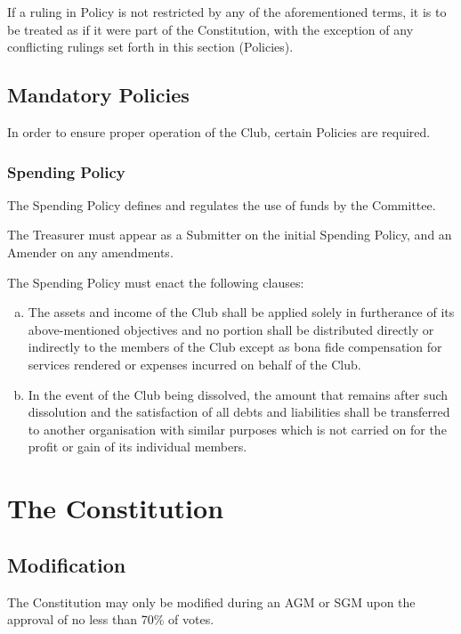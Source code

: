 \documentclass[a4paper,12pt]{article}
\begin{document}
If a ruling in Policy is not restricted by any of the aforementioned terms, it is to be treated as if it were part of the Constitution, with the exception of any conflicting rulings set forth in this section (Policies).

\subsection{Mandatory Policies}

In order to ensure proper operation of the Club, certain Policies are required.

\subsubsection{Spending Policy}
The Spending Policy defines and regulates the use of funds by the Committee.

The Treasurer must appear as a Submitter on the initial Spending Policy, and an Amender on any amendments.

The Spending Policy must enact the following clauses:
\begin{enumerate}[a)]
    \item The assets and income of the Club shall be applied solely in furtherance of its above-mentioned objectives and no portion shall be distributed directly or indirectly to the members of the Club except as bona fide compensation for services rendered or expenses incurred on behalf of the Club.
    \item In the event of the Club being dissolved, the amount that remains after such dissolution and the satisfaction of all debts and liabilities shall be transferred to another organisation with similar purposes which is not carried on for the profit or gain of its individual members.
\end{enumerate}

\section{The Constitution}

\subsection{Modification}

The Constitution may only be modified during an AGM or SGM upon the approval of no less than 70\% of votes.
\end{document}
